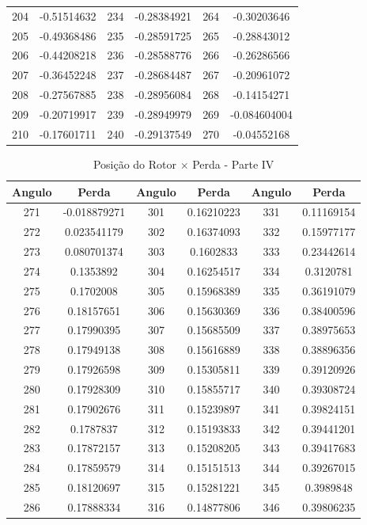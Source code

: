 \documentclass[
	12pt,				%
	openright,			%
	twoside,			%
	a4paper,			%
	english,			%
	french,				%
	spanish,			%
	brazil,				%
	]{abntex2}
\begin{document}
\begin{apendicesenv}
\begin{table}[H]
\begin{tabular}{c c| c c | c c}
204 & -0.51514632 & 234 & -0.28384921 & 264 & -0.30203646\\
205 & -0.49368486 & 235 & -0.28591725 & 265 & -0.28843012\\
206 & -0.44208218 & 236 & -0.28588776 & 266 & -0.26286566\\
207 & -0.36452248 & 237 & -0.28684487 & 267 & -0.20961072\\
208 & -0.27567885 & 238 & -0.28956084 & 268 & -0.14154271\\
209 & -0.20719917 & 239 & -0.28949979 & 269 & -0.084604004\\
210 & -0.17601711 & 240 & -0.29137549 & 270 & -0.04552168
\end{tabular}
\end{table}

\newpage
\begin{table}[H]
\caption{Posição do Rotor $\times$  Perda - Parte IV \label{tab:pr_iv}}
\centering
\begin{tabular}{c c| c c | c c}
Angulo & Perda & Angulo & Perda & Angulo & Perda \\
\hline
271 & -0.018879271 & 301 & 0.16210223 & 331 & 0.11169154\\
272 & 0.023541179 & 302 & 0.16374093 & 332 & 0.15977177\\
273 & 0.080701374 & 303 & 0.1602833 & 333 & 0.23442614\\
274 & 0.1353892 & 304 & 0.16254517 & 334 & 0.3120781\\
275 & 0.1702008 & 305 & 0.15968389 & 335 & 0.36191079\\
276 & 0.18157651 & 306 & 0.15630369 & 336 & 0.38400596\\
277 & 0.17990395 & 307 & 0.15685509 & 337 & 0.38975653\\
278 & 0.17949138 & 308 & 0.15616889 & 338 & 0.38896356\\
279 & 0.17926598 & 309 & 0.15305811 & 339 & 0.39120926\\
280 & 0.17928309 & 310 & 0.15855717 & 340 & 0.39308724\\
281 & 0.17902676 & 311 & 0.15239897 & 341 & 0.39824151\\
282 & 0.1787837 & 312 & 0.15193833 & 342 & 0.39441201\\
283 & 0.17872157 & 313 & 0.15208205 & 343 & 0.39417683\\
284 & 0.17859579 & 314 & 0.15151513 & 344 & 0.39267015\\
285 & 0.18120697 & 315 & 0.15281221 & 345 & 0.3989848\\
286 & 0.17888334 & 316 & 0.14877806 & 346 & 0.39806235\\

\end{tabular}
\end{table}
\end{apendicesenv}
\end{document}
